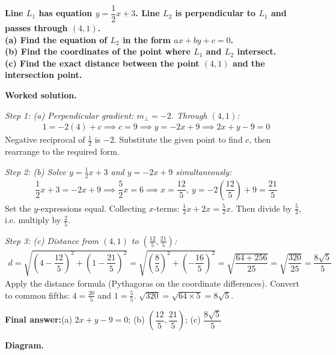 \documentclass[11pt]{article}
\newcommand{\question}[1]{\par\medskip\noindent\textbf{#1}\par}
\begin{document}
\question{Line \( L_1 \) has equation \( y = \dfrac{1}{2}x + 3 \). Line \( L_2 \) is perpendicular to \( L_1 \) and passes through \( (4, 1) \). \\[3pt] (a) Find the equation of \( L_2 \) in the form \( ax + by + c = 0 \). \\[3pt] (b) Find the coordinates of the point where \( L_1 \) and \( L_2 \) intersect. \\[3pt] (c) Find the exact distance between the point \( (4, 1) \) and the intersection point.}

\textbf{Worked solution.}

\textit{Step 1: (a) Perpendicular gradient: \( m_\perp = -2 \). Through \( (4, 1) \):}
\[\begin{gathered}
1 = -2(4) + c \implies c = 9 \implies y = -2x + 9 \implies 2x + y - 9 = 0
\end{gathered}\]
Negative reciprocal of \( \tfrac{1}{2} \) is \( -2 \). Substitute the given point to find \( c \), then rearrange to the required form.

\textit{Step 2: (b) Solve \( y = \frac{1}{2}x + 3 \) and \( y = -2x + 9 \) simultaneously:}
\[\begin{gathered}
\dfrac{1}{2}x + 3 = -2x + 9 \implies \dfrac{5}{2}x = 6 \implies x = \dfrac{12}{5},\ y = -2\left(\dfrac{12}{5}\right)+9 = \dfrac{21}{5}
\end{gathered}\]
Set the \( y \)-expressions equal. Collecting \( x \)-terms: \( \tfrac{1}{2}x + 2x = \tfrac{5}{2}x \). Then divide by \( \tfrac{5}{2} \), i.e. multiply by \( \tfrac{2}{5} \).

\textit{Step 3: (c) Distance from \( (4, 1) \) to \( \left(\frac{12}{5}, \frac{21}{5}\right) \):}
\[\begin{gathered}
d = \sqrt{\left(4 - \dfrac{12}{5}\right)^2 + \left(1 - \dfrac{21}{5}\right)^2} = \sqrt{\left(\dfrac{8}{5}\right)^2 + \left(-\dfrac{16}{5}\right)^2} = \sqrt{\dfrac{64 + 256}{25}} = \sqrt{\dfrac{320}{25}} = \dfrac{8\sqrt{5}}{5}
\end{gathered}\]
Apply the distance formula (Pythagoras on the coordinate differences). Convert to common fifths: \( 4 = \tfrac{20}{5} \) and \( 1 = \tfrac{5}{5} \). \( \sqrt{320} = \sqrt{64 \times 5} = 8\sqrt{5} \).

\begin{answerbox}
\textbf{Final answer:}\quad (a) \(\displaystyle 2x+y-9=0\); (b) \(\displaystyle \left(\dfrac{12}{5}, \dfrac{21}{5}\right)\); (c) \(\displaystyle \dfrac{8\sqrt{5}}{5}\)
\end{answerbox}
\textbf{Diagram.}
\end{document}
